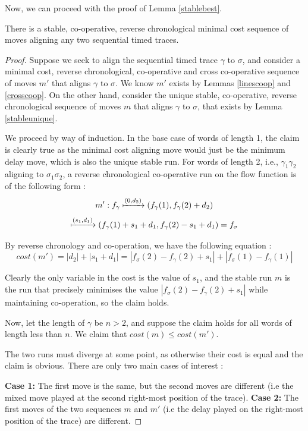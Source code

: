 \documentclass[runningheads]{llncs}
\newcounter{cases}
\begin{document}
Now, we can proceed with the proof of Lemma \ref{stablebest}. 
\begin{lemma*}
	There is a stable, co-operative, reverse chronological minimal cost sequence of moves aligning any two sequential timed traces. 
\end{lemma*}
\begin{proof}
Suppose we seek to align the sequential timed trace $\gamma$ to $\sigma$, and consider a minimal cost, reverse chronological, co-operative and cross co-operative sequence of moves $m'$ that aligns $\gamma$ to $\sigma$. 
We know $m'$ exists by Lemmas \ref{linescoop} and \ref{crosscoop}. 
On the other hand, consider the unique stable, co-operative, reverse chronological sequence of moves $m$ that aligns $\gamma$ to $\sigma$, that exists by Lemma \ref{stableunique}. 

We proceed by way of induction. 
In the base case of words of length 1, the claim is clearly true as the minimal cost aligning move would just be the minimum delay move, which is also the unique stable run. 
For words of length 2, i.e., $\gamma_1\gamma_2$ aligning to $\sigma_1\sigma_2$, a reverse chronological co-operative run on the flow function is of the following form : $$m' : f_\gamma \xmapsto{(0,d_2)} (f_\gamma(1), f_\gamma(2) + d_2)$$$$ \xmapsto{(s_1,d_1)} (f_\gamma(1) + s_1 + d_1, f_\gamma(2) - s_1 + d_1) = f_\sigma$$

By reverse chronology and co-operation, we have the following equation : 
$$cost(m') = |d_2| + |s_1 + d_1| = |f_\sigma(2) - f_\gamma(2) + s_1| + |f_\sigma(1) - f_\gamma(1)|$$

Clearly the only variable in the cost is the value of $s_1$, and the stable run $m$ is the run that precisely minimises the value $|f_\sigma(2) - f_\gamma(2) + s_1|$ while maintaining co-operation, so the claim holds. 

Now, let the length of $\gamma$ be $n > 2$, and suppose the claim holds for all words of length less than $n$. 
We claim that $cost(m) \leq cost(m')$. 

The two runs must diverge at some point, as otherwise their cost is equal and the claim is obvious. There are only two main cases of interest : 

\textbf{Case 1: } The first move is the same, but the second moves are different (i.e the mixed move played at the second right-most position of the trace). 
\textbf{Case 2: }The first moves of the two sequences $m$ and $m'$ (i.e the delay played on the right-most position of the trace) are different. 




\end{proof}
\end{document}
